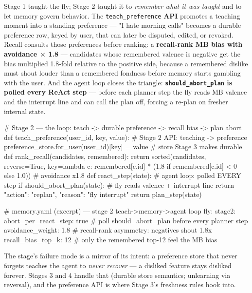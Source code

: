 \documentclass[11pt]{article}
\begin{document}
Stage 1 taught the fly; Stage 2 taught it to \emph{remember what it was taught} and to let memory govern behavior. The \texttt{teach\_preference} \textbf{API} promotes a teaching moment into a standing preference — "I hate morning calls" becomes a durable preference row, keyed by user, that can later be disputed, edited, or revoked. Recall consults those preferences before ranking: a \textbf{recall-rank MB bias with avoidance × 1.8} — candidates whose remembered valence is negative get the bias multiplied 1.8-fold relative to the positive side, because a remembered dislike must shout louder than a remembered fondness before memory starts gambling with the user. And the agent loop closes the triangle: \textbf{\texttt{should\_abort\_plan} is polled every ReAct step} — before each planner step the fly reads MB valence and the interrupt line and can call the plan off, forcing a re-plan on fresher internal state.

\begin{CodeBlock}
# Stage 2 — the loop: teach -> durable preference -> recall bias -> plan abort
def teach_preference(user_id, key, value):        # Stage 2 API: teaching -> preference
    preference_store.for_user(user_id)[key] = value   # store Stage 3 makes durable
def rank_recall(candidates, remembered):
    return sorted(candidates, reverse=True,
                  key=lambda c: remembered[c.id] *
                                (1.8 if remembered[c.id] < 0 else 1.0))  # avoidance x1.8
def react_step(state):                            # agent loop: polled EVERY step
    if should_abort_plan(state):                  # fly reads valence + interrupt line
        return {"action": "replan", "reason": "fly interrupt"}
    return plan_step(state)
\end{CodeBlock}

\begin{CodeBlock}
# memory.yaml (excerpt) — stage 2 teach->memory->agent loop
fly:
  stage2:
    abort_per_react_step: true    # poll should_abort_plan before every planner step
    avoidance_weight: 1.8         # recall-rank asymmetry: negatives shout 1.8x
    recall_bias_top_k: 12         # only the remembered top-12 feel the MB bias
\end{CodeBlock}

The stage's failure mode is a mirror of its intent: a preference store that never forgets teaches the agent to \emph{never recover} — a disliked feature stays disliked forever. Stages 3 and 4 handle that (durable store semantics; unlearning via reversal), and the preference API is where Stage 3's freshness rules hook into.
\end{document}

